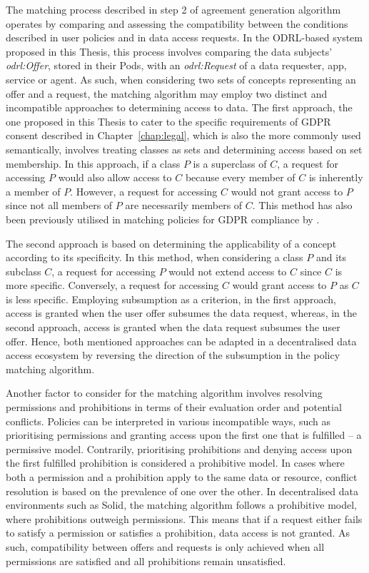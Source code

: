 The matching process described in step 2 of agreement generation algorithm operates by comparing and assessing the compatibility between the conditions described in user policies and in data access requests.
In the ODRL-based system proposed in this Thesis, this process involves comparing the data subjects' \textit{odrl:Offer}, stored in their Pods, with an \textit{odrl:Request} of a data requester, app, service or agent.
As such, when considering two sets of concepts representing an offer and a request, the matching algorithm may employ two distinct and incompatible approaches to determining access to data.
The first approach, the one proposed in this Thesis to cater to the specific requirements of GDPR consent described in Chapter~\ref{chap:legal}, which is also the more commonly used semantically, involves treating classes as sets and determining access based on set membership.
In this approach, if a class $P$ is a superclass of $C$, a request for accessing $P$ would also allow access to $C$ because every member of $C$ is inherently a member of $P$.
However, a request for accessing $C$ would not grant access to $P$ since not all members of $P$ are necessarily members of $C$.
This method has also been previously utilised in matching policies for GDPR compliance by \cite{bonatti_realtime_2020}.

The second approach is based on determining the applicability of a concept according to its specificity.
In this method, when considering a class $P$ and its subclass $C$, a request for accessing $P$ would not extend access to $C$ since $C$ is more specific.
Conversely, a request for accessing $C$ would grant access to $P$ as $C$ is less specific.
Employing subsumption as a criterion, in the first approach, access is granted when the user offer subsumes the data request, whereas, in the second approach, access is granted when the data request subsumes the user offer.
Hence, both mentioned approaches can be adapted in a decentralised data access ecosystem by reversing the direction of the subsumption in the policy matching algorithm.

Another factor to consider for the matching algorithm involves resolving permissions and prohibitions in terms of their evaluation order and potential conflicts.
Policies can be interpreted in various incompatible ways, such as prioritising permissions and granting access upon the first one that is fulfilled -- a permissive model.
Contrarily, prioritising prohibitions and denying access upon the first fulfilled prohibition is considered a prohibitive model.
In cases where both a permission and a prohibition apply to the same data or resource, conflict resolution is based on the prevalence of one over the other.
In decentralised data environments such as Solid, the matching algorithm follows a prohibitive model, where prohibitions outweigh permissions.
This means that if a request either fails to satisfy a permission or satisfies a prohibition, data access is not granted.
As such, compatibility between offers and requests is only achieved when all permissions are satisfied and all prohibitions remain unsatisfied.

